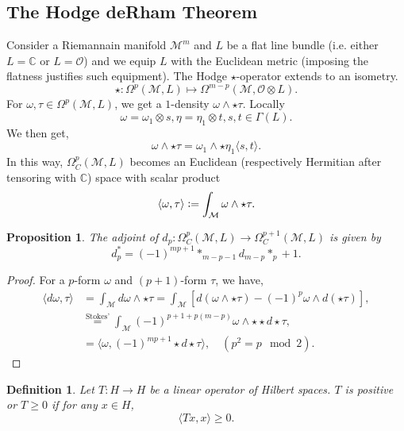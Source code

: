 \documentclass[10pt]{article}
\newtheorem{proposition}{Proposition}[section]
\newtheorem{definition}{Definition}[section]
\newcommand{\defeq}{\vcentcolon=}
\newcommand{\C}[0]{\mathbb{C}}
\newcommand{\M}[0]{\mathcal{M}}
\begin{document}
\subsection{The Hodge deRham Theorem}
Consider a Riemannain manifold $\M^m$ and $L$ be a flat line bundle (i.e. either $L=\C$ or $L=\mathcal{O}$) and we equip $L$ with the Euclidean metric (imposing the flatness justifies such equipment). The Hodge $\star$-operator extends to an isometry.
\begin{equation*}
  \star:\Omega^p(\M,L)\mapsto \Omega^{m-p}(\M,\mathcal{O}\otimes L).
\end{equation*}
For $\omega,\tau\in\Omega^p(\M,L)$, we get a $1$-density $\omega\wedge\star\tau$. Locally 
\begin{equation*}
\omega=\omega_1\otimes s,\eta=\eta_1\otimes t, s,t\in\Gamma(L).
\end{equation*}
We then get,
\begin{equation*}
\omega\wedge\star\tau = \omega_1\wedge\star\eta_1\langle s,t\rangle.
\end{equation*}
In this way, $\Omega^p_{C}(\M,L)$ becomes an Euclidean (respectively Hermitian after tensoring with $\C$) space with scalar product 
\begin{equation*}
\langle \omega,\tau\rangle \defeq\int_\M\omega\wedge\star\tau.
\end{equation*}
\begin{proposition}
  The adjoint of $d_p:\Omega^p_C(\M,L)\to\Omega^{p+1}_C(\M,L)$ is given by 
  \begin{equation*}
  d_p^*=(-1)^{mp+1}\ast_{m-p-1}d_{m-p}\ast_p+1.
  \end{equation*}
\end{proposition}
\begin{proof}
  For a $p$-form $\omega$ and $(p+1)$-form $\tau$, we have,
  \begin{align*}
    \langle d\omega,\tau\rangle &= \int_\M d\omega\wedge\star\tau = \int_\M[d(\omega\wedge\star\tau)-(-1)^p\omega\wedge d(\star\tau)],\\
    & \stackrel{\text{Stokes'}}{=}\int_\M (-1)^{p+1+p(m-p)}\omega\wedge\star\star d\star\tau,\\
    & = \langle\omega,(-1)^{mp+1}\star d\star\tau\rangle, \quad(p^2=p\mod{2}).
  \end{align*}
\end{proof}
\begin{definition}
  Let $T:H\to H$ be a linear operator of Hilbert spaces. $T$ is positive or $T\geq0$ if for any $x\in H$, 
  \begin{equation*}
    \langle Tx,x\rangle \geq0.
  \end{equation*}
\end{definition}
\end{document}
